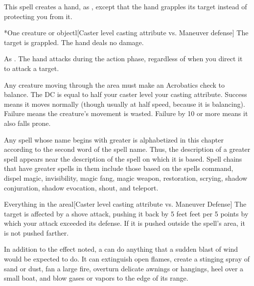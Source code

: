 \spellrng{\rngmed}
\spelldur{\durshort \dismissable}
\spellline
\spelleffect This spell creates a hand, as , except that the hand grapples its target instead of protecting you from it.
\begin{spelltarget}*{One creature or object}l[Caster level \add casting attribute vs. Maneuver defense]
    \spellsuccess The target is grappled. The hand deals no damage.
\end{spelltarget}
\spellnotes As . The hand attacks during the action phase, regardless of when you direct it to attack a target.

\spelldur{\durshort \dismissable}
\spellline
\spelleffect Any creature moving through the area must make an Acrobatics check to balance. The DC is equal to half your caster level \add your casting attribute. Success means it moves normally (though usually at half speed, because it is balancing). Failure means the creature's movement is wasted. Failure by 10 or more means it also falls prone.

\par Any spell whose name begins with greater is alphabetized in this chapter according to the second word of the spell name. Thus, the description of a greater spell appears near the description of the spell on which it is based. Spell chains that have greater spells in them include those based on the spells command, dispel magic, invisibility, magic fang, magic weapon, restoration, scrying, shadow conjuration, shadow evocation, shout, and teleport.

\begin{spelltarget}{Everything in the area}l[Caster level \add casting attribute vs. Maneuver Defense]
    \spellsuccess The target is affected by a shove attack, pushing it back by 5 feet  feet per 5 points by which your attack exceeded its defense. If it is pushed outside the spell's area, it is not pushed farther.
\end{spelltarget}
\spellnotes In addition to the effect noted, a  can do anything that a sudden blast of wind would be expected to do. It can extinguish open flames, create a stinging spray of sand or dust, fan a large fire, overturn delicate awnings or hangings, heel over a small boat, and blow gases or vapors to the edge of its range.

